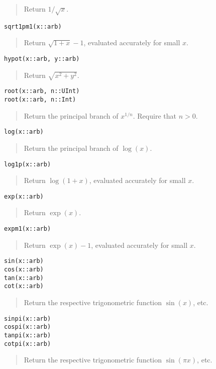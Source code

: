 \documentclass[a4paper,10pt]{article}
\newcommand{\desc}[1]{\vspace{-3mm}\begin{quote}#1\end{quote}}
\begin{document}
{{\desc{Return $1 / \sqrt{x}$.}

\begin{lstlisting}
sqrt1pm1(x::arb)
\end{lstlisting}

\desc{Return $\sqrt{1+x}-1$, evaluated accurately for small $x$.}

\begin{lstlisting}
hypot(x::arb, y::arb)
\end{lstlisting}

\desc{Return $\sqrt{x^2 + y^2}$.}

\begin{lstlisting}
root(x::arb, n::UInt)
root(x::arb, n::Int)
\end{lstlisting}

\desc{Return the principal branch of $x^{1/n}$. Require that $n > 0$.}

\begin{lstlisting}
log(x::arb)
\end{lstlisting}

\desc{Return the principal branch of $\log(x)$.}

\begin{lstlisting}
log1p(x::arb)
\end{lstlisting}

\desc{Return $\log(1+x)$, evaluated accurately for small $x$.}

\begin{lstlisting}
exp(x::arb)
\end{lstlisting}

\desc{Return $\exp(x)$.}

\begin{lstlisting}
expm1(x::arb)
\end{lstlisting}

\desc{Return $\exp(x)-1$, evaluated accurately for small $x$.}

\begin{lstlisting}
sin(x::arb)
cos(x::arb)
tan(x::arb)
cot(x::arb)
\end{lstlisting}

\desc{Return the respective trigonometric function $\sin(x)$, etc.}

\begin{lstlisting}
sinpi(x::arb)
cospi(x::arb)
tanpi(x::arb)
cotpi(x::arb)
\end{lstlisting}

\desc{Return the respective trigonometric function $\sin(\pi x)$, etc.}

}}
\end{document}
